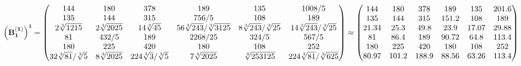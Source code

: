 \documentclass[10pt,a4paper]{article}
\begin{document}
	\[
		\left(\bold{B_1^{(1)}}\right)^{4} = 
		\begin{pmatrix}
			{{144}}{} & {{180}}{} & {{378}}{} & {{189}}{} & {{135}}{} & {{1008}} / {{5}} \\
			{{135}}{} & {{144}}{} & {{315}}{} & {{756}} / {{5}} & {{108}}{} & {{189}}{} \\
			{{2}\sqrt[3]{1215}}{} & {{2}\sqrt[3]{2025}}{} & {{14}\sqrt[3]{45}}{} & {{56}\sqrt[3]{243}} / {\sqrt[3]{3125}} & {{8}\sqrt[3]{243}} / {\sqrt[3]{25}} & {{14}\sqrt[3]{243}} / {\sqrt[3]{25}} \\
			{{81}}{} & {{432}} / {{5}} & {{189}}{} & {{2268}} / {{25}} & {{324}} / {{5}} & {{567}} / {{5}} \\
			{{180}}{} & {{225}}{} & {{420}}{} & {{180}}{} & {{108}}{} & {{252}}{} \\
			{{32}\sqrt[3]{81}} / {\sqrt[3]{5}} & {{8}\sqrt[3]{2025}}{} & {{224}\sqrt[3]{3}} / {\sqrt[3]{5}} & {{7}\sqrt[3]{2025}}{} & {\sqrt[3]{253125}}{} & {{224}\sqrt[3]{81}} / {\sqrt[3]{625}} \\
		\end{pmatrix}
		\approx
		\begin{pmatrix}
			144      & 180      & 378      & 189      & 135      & 201.6    \\
			135      & 144      & 315      & 151.2    & 108      & 189      \\
			21.34    & 25.3     & 49.8     & 23.9     & 17.07    & 29.88    \\
			81       & 86.4     & 189      & 90.72    & 64.8     & 113.4    \\
			180      & 225      & 420      & 180      & 108      & 252      \\
			80.97    & 101.2    & 188.9    & 88.56    & 63.26    & 113.4    \\
		\end{pmatrix}
	\]
\end{document}
